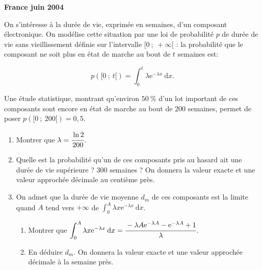 \begin{exercice}

 \noindent
\textbf{\Large France juin 2004}

\vspace{0,5cm}

On s'int\'eresse \`a la dur\'ee de vie, exprim\'ee en semaines, d'un composant \'electronique.
 On mod\'elise cette situation par une loi de probabilit\'e $p$ de dur\'ee de vie sans
 vieillissement d\'efinie sur l'intervalle $[0~;~ + \infty[$ : la probabilit\'e que le 
composant ne soit plus en \'etat de marche au bout de $t$ semaines est:

\[p([0~;~ t[)  = \displaystyle\int_0^t \lambda \text{e}^{-\lambda 
x}\:\text{d}x.\]

\noindent Une \'etude statistique, montrant qu'environ $50\:\%$ d'un lot important de 
ces composants sont encore en \'etat de marche au bout de 200 semaines, permet de 
poser $p([0~;~ 200[) = 0,5$.

\begin{enumerate} \item Montrer que $\lambda = \cfrac{\ln 2}{200}$.

\item Quelle est la probabilit\'e qu'un de ces composants pris au hasard ait une dur\'ee
 de vie sup\'erieure ? 300 semaines ? On donnera la valeur exacte et une valeur 
approch\'ee d\'ecimale au centi\`eme pr\`es.

\item On admet que la dur\'ee de vie moyenne $d_m$ de ces composants est la limite quand 
$A$ tend vers $+ \infty$ de $\displaystyle\int_0^A \lambda x\text{e}^{-\lambda 
x}\:\text{d}x$.

\begin{enumerate} \item Montrer que $\displaystyle\int_0^A \lambda x\text{e}^{-\lambda 
x}\:\text{d}x = \cfrac{- \lambda A\text{e}^{-\lambda A} - \text{e}^{- 
\lambda A} + 1}{\lambda}$.

\item En d\'eduire $d_m$. On donnera la valeur exacte et une valeur approch\'ee d\'ecimale \`a
la semaine pr\`es.

\end{enumerate}

\end{enumerate}
\end{exercice}
